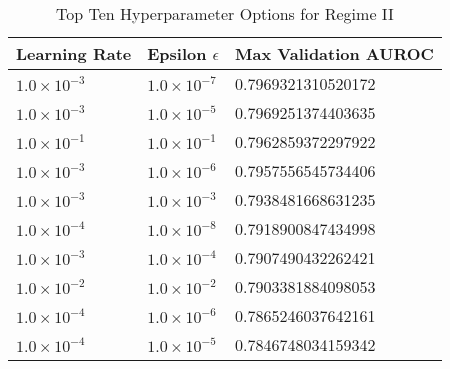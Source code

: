\begin{table}[H]
    \centering
    \begin{tabular}{@{}lll@{}}
    \toprule
    Learning Rate & Epsilon \(\epsilon\) & Max Validation AUROC \\ \midrule
    \(1.0 \times 10^{-3}\) & \(1.0 \times 10^{-7}\) & 0.7969321310520172   \\
    \(1.0 \times 10^{-3}\) & \(1.0 \times 10^{-5}\) & 0.7969251374403635   \\
    \(1.0 \times 10^{-1}\) & \(1.0 \times 10^{-1}\) & 0.7962859372297922   \\
    \(1.0 \times 10^{-3}\) & \(1.0 \times 10^{-6}\) & 0.7957556545734406   \\
    \(1.0 \times 10^{-3}\) & \(1.0 \times 10^{-3}\) & 0.7938481668631235   \\
    \(1.0 \times 10^{-4}\) & \(1.0 \times 10^{-8}\) & 0.7918900847434998   \\
    \(1.0 \times 10^{-3}\) & \(1.0 \times 10^{-4}\) & 0.7907490432262421   \\
    \(1.0 \times 10^{-2}\) & \(1.0 \times 10^{-2}\) & 0.7903381884098053   \\
    \(1.0 \times 10^{-4}\) & \(1.0 \times 10^{-6}\) & 0.7865246037642161   \\
    \(1.0 \times 10^{-4}\) & \(1.0 \times 10^{-5}\) & 0.7846748034159342   \\ \bottomrule
    \end{tabular}
    \caption{Top Ten Hyperparameter Options for Regime II}\label{tab:regime-II-top-ten}
\end{table}